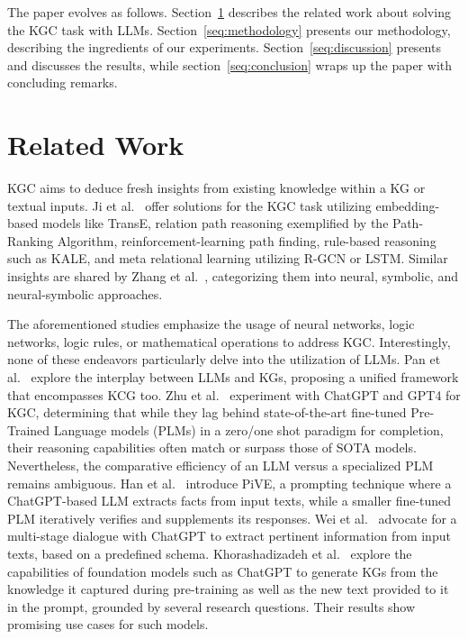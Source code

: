 \documentclass[runningheads]{llncs}
\begin{document}

The paper evolves as follows. Section~\ref{seq:related} describes the related work about solving the KGC task  with LLMs. Section~\ref{seq:methodology} presents our methodology, describing the ingredients of our experiments. Section~\ref{seq:discussion} presents and discusses the results, while section~\ref{seq:conclusion} wraps up the paper with concluding remarks.

\section{Related Work}
\label{seq:related}


KGC aims to deduce fresh insights from existing knowledge within a KG or textual inputs. Ji et al.~\cite{ji2022} offer solutions for the KGC task utilizing embedding-based models like TransE, relation path reasoning exemplified by the Path-Ranking Algorithm, reinforcement-learning path finding, rule-based reasoning such as KALE, and meta relational learning utilizing R-GCN or LSTM. Similar insights are shared by Zhang et al.~\cite{zhang2021}, categorizing them into neural, symbolic, and neural-symbolic approaches. 

The aforementioned studies emphasize the usage of neural networks, logic networks, logic rules, or mathematical operations to address KGC. Interestingly, none of these endeavors particularly delve into the utilization of LLMs. Pan et al.~\cite{pan2023} explore the interplay between LLMs and KGs, proposing a unified framework that encompasses KCG too. Zhu et al.~\cite{zhu2023} experiment with ChatGPT and GPT4 for KGC, determining that while they lag behind state-of-the-art fine-tuned Pre-Trained Language models (PLMs) in a zero/one shot paradigm for completion, their reasoning capabilities often match or surpass those of SOTA models. Nevertheless, the comparative efficiency of an LLM versus a specialized PLM remains ambiguous. Han et al.~\cite{han2023} introduce PiVE, a prompting technique where a ChatGPT-based LLM extracts facts from input texts, while a smaller fine-tuned PLM iteratively verifies and supplements its responses. Wei et al.~\cite{wei2023} advocate for a multi-stage dialogue with ChatGPT to extract pertinent information from input texts, based on a predefined schema. 
Khorashadizadeh et al.~\cite{khorashadizadeh2023} explore the capabilities of foundation models such as ChatGPT to generate KGs from the knowledge it captured during pre-training as well as the new text provided to it in the prompt, grounded by several research questions. Their results show promising use cases for such models. 
\end{document}
